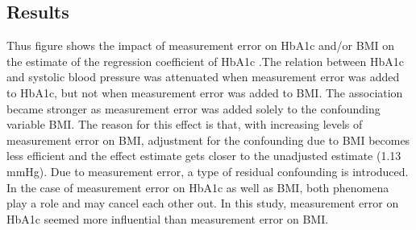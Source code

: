 \documentclass[
  letterpaper,
  DIV=11,
  numbers=noendperiod]{scrartcl}
\newenvironment{Shaded}{\begin{snugshade}}{\end{snugshade}}
\newcommand{\AttributeTok}[1]{\textcolor[rgb]{0.40,0.45,0.13}{#1}}
\newcommand{\ControlFlowTok}[1]{\textcolor[rgb]{0.00,0.23,0.31}{#1}}
\newcommand{\DecValTok}[1]{\textcolor[rgb]{0.68,0.00,0.00}{#1}}
\newcommand{\FunctionTok}[1]{\textcolor[rgb]{0.28,0.35,0.67}{#1}}
\newcommand{\NormalTok}[1]{\textcolor[rgb]{0.00,0.23,0.31}{#1}}
\newcommand{\OtherTok}[1]{\textcolor[rgb]{0.00,0.23,0.31}{#1}}
\newcommand{\SpecialCharTok}[1]{\textcolor[rgb]{0.37,0.37,0.37}{#1}}
\begin{document}
\begin{Shaded}
\end{Shaded}

\hypertarget{results}{%
\subsection{Results}\label{results}}

Thus figure shows the impact of measurement error on HbA1c and/or BMI on
the estimate of the regression coefficient of HbA1c .The relation
between HbA1c and systolic blood pressure was attenuated when
measurement error was added to HbA1c, but not when measurement error was
added to BMI. The association became stronger as measurement error was
added solely to the confounding variable BMI. The reason for this effect
is that, with increasing levels of measurement error on BMI, adjustment
for the confounding due to BMI becomes less efficient and the effect
estimate gets closer to the unadjusted estimate (1.13 mmHg). Due to
measurement error, a type of residual confounding is introduced. In the
case of measurement error on HbA1c as well as BMI, both phenomena play a
role and may cancel each other out. In this study, measurement error on
HbA1c seemed more influential than measurement error on BMI.
\end{document}
